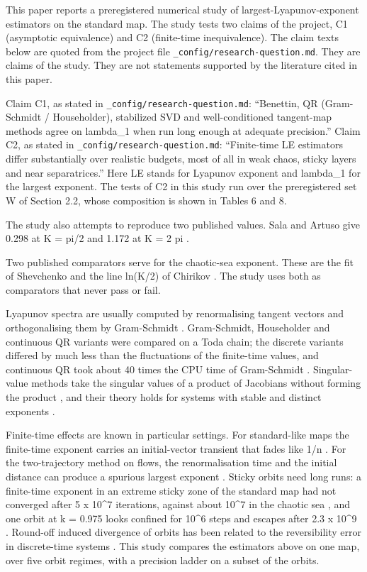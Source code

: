 \documentclass[
  11pt,
]{article}
\begin{document}
This paper reports a preregistered numerical study of
largest-Lyapunov-exponent estimators on the standard map. The study
tests two claims of the project, C1 (asymptotic equivalence) and C2
(finite-time inequivalence). The claim texts below are quoted from the
project file \texttt{\_config/research-question.md}. They are claims of
the study. They are not statements supported by the literature cited in
this paper.

Claim C1, as stated in \texttt{\_config/research-question.md}:
``Benettin, QR (Gram-Schmidt / Householder), stabilized SVD and
well-conditioned tangent-map methods agree on lambda\_1 when run long
enough at adequate precision.'' Claim C2, as stated in
\texttt{\_config/research-question.md}: ``Finite-time LE estimators
differ substantially over realistic budgets, most of all in weak chaos,
sticky layers and near separatrices.'' Here LE stands for Lyapunov
exponent and lambda\_1 for the largest exponent. The tests of C2 in this
study run over the preregistered set W of Section 2.2, whose composition
is shown in Tables 6 and 8.

The study also attempts to reproduce two published values. Sala and
Artuso give 0.298 at K = pi/2 and 1.172 at K = 2 pi
\citep{SalaArtuso2015}.

Two published comparators serve for the chaotic-sea exponent. These are
the fit of Shevchenko \citep{Shevchenko2014} and the line ln(K/2) of
Chirikov \citep{Chirikov1979}. The study uses both as comparators that
never pass or fail.

Lyapunov spectra are usually computed by renormalising tangent vectors
and orthogonalising them by Gram-Schmidt
\citep{Benettin1980a, Benettin1980b, ShimadaNagashima1979}.
Gram-Schmidt, Householder and continuous QR variants were compared on a
Toda chain; the discrete variants differed by much less than the
fluctuations of the finite-time values, and continuous QR took about 40
times the CPU time of Gram-Schmidt \citep{Geist1990}. Singular-value
methods take the singular values of a product of Jacobians without
forming the product \citep{Stewart1997}, and their theory holds for
systems with stable and distinct exponents \citep{DieciElia2006}.

Finite-time effects are known in particular settings. For standard-like
maps the finite-time exponent carries an initial-vector transient that
fades like 1/n \citep{SalaArtuso2015}. For the two-trajectory method on
flows, the renormalisation time and the initial distance can produce a
spurious largest exponent \citep{DubeibeBermudezAlmanza2014}. Sticky
orbits need long runs: a finite-time exponent in an extreme sticky zone
of the standard map had not converged after 5 x 10\^{}7 iterations,
against about 10\^{}7 in the chaotic sea
\citep{HarsoulaKaramanosContopoulos2019}, and one orbit at k = 0.975
looks confined for 10\^{}6 steps and escapes after 2.3 x 10\^{}9
\citep{Meiss2015}. Round-off induced divergence of orbits has been
related to the reversibility error in discrete-time systems
\citep{FarandaMestreTurchetti2012}. This study compares the estimators
above on one map, over five orbit regimes, with a precision ladder on a
subset of the orbits.
\end{document}

